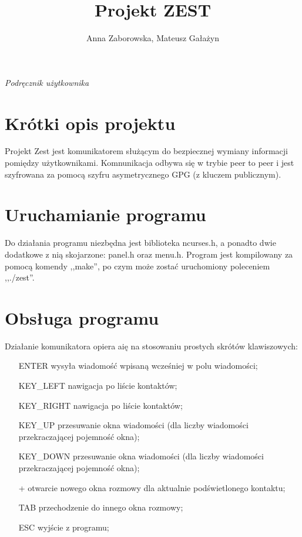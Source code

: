 \documentclass[11pt,a4paper]{article}
\author{Anna Zaborowska, Mateusz Gałażyn}
\title{Projekt ZEST}
\begin{document}
\maketitle

\begin{center}
\Large {\textsl{Podręcznik użytkownika}}
\end{center}

\section{Krótki opis projektu}

Projekt Zest jest komunikatorem służącym do bezpiecznej wymiany informacji pomiędzy użytkownikami. Komnunikacja odbywa się w trybie peer to peer i jest szyfrowana za pomocą szyfru asymetrycznego GPG (z kluczem publicznym).

\section{Uruchamianie programu}

Do działania programu niezbędna jest biblioteka ncurses.h, a ponadto dwie dodatkowe z nią skojarzone: panel.h oraz menu.h. Program jest kompilowany za pomocą komendy ,,make'', po czym może zostać uruchomiony poleceniem ,,./zest''.

\section{Obsługa programu}

Działanie komunikatora opiera aię na stosowaniu prostych skrótów klawiszowych:
\begin{itemize}
\item[ ENTER ] wysyła wiadomość wpisaną wcześniej w polu wiadomości;
\item[ KEY\_LEFT ] nawigacja po liście kontaktów; 
\item[ KEY\_RIGHT ] nawigacja po liście kontaktów; 
\item[ KEY\_UP ] przesuwanie okna wiadomości (dla liczby wiadomości przekraczającej pojemność okna);
\item[ KEY\_DOWN ] przesuwanie okna wiadomości (dla liczby wiadomości przekraczającej pojemność okna);
\item[ + ] otwarcie nowego okna rozmowy dla aktualnie podświetlonego kontaktu;
\item[ TAB ] przechodzenie do innego okna rozmowy;
\item[ ESC ] wyjście z programu;
\end{itemize}
\end{document}
